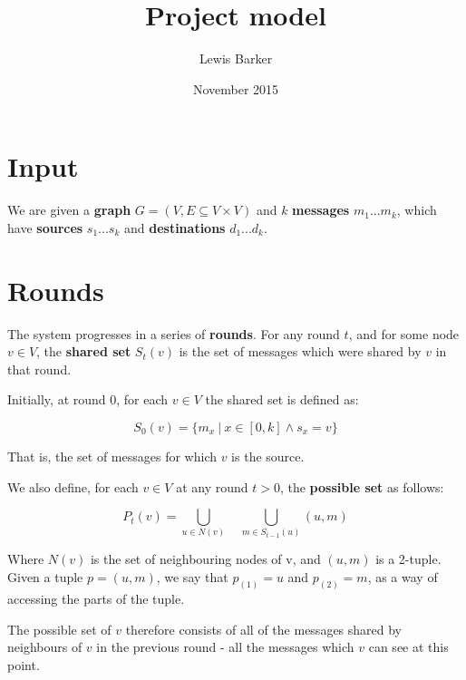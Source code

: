 \documentclass{article}
\begin{document}
\author{Lewis Barker}
\title{Project model}
\date{November 2015}
\maketitle

\section{Input}
We are given a \textbf{graph} $G = (V, E \subseteq V \times V)$ and $k$ \textbf{messages} $ m_{1} ... m_{k}$, which have \textbf{sources} $s_{1} ... s_{k}$ and \textbf{destinations} $d_{1} ... d_{k}$.

\section{Rounds}
The system progresses in a series of \textbf{rounds}. For any round $t$, and for some node $v \in V$, the \textbf{shared set} $S_{t}(v)$ is the set of messages which were shared by $v$ in that round.

Initially, at round 0, for each $v \in V$ the shared set is defined as:

\begin{equation}
S_{0}(v) = \{m_{x} ~|~ x \in [0, k] \wedge s_{x} = v\}
\end{equation}

That is, the set of messages for which $v$ is the source.

We also define, for each $v \in V$ at any round $t > 0$, the \textbf{possible set} as follows:

\begin{equation}
P_{t}(v) = \bigcup_{u \in N(v)} \quad \bigcup_{m \in S_{t-1}(u)} (u, m)
\end{equation}

Where $N(v)$ is the set of neighbouring nodes of v, and $(u, m)$ is a 2-tuple. Given a tuple $p = (u, m)$, we say that $p_{(1)} = u$ and $p_{(2)} = m$, as a way of accessing the parts of the tuple.

The possible set of $v$ therefore consists of all of the messages shared by neighbours of $v$ in the previous round - all the messages which $v$ can see at this point.
\end{document}

